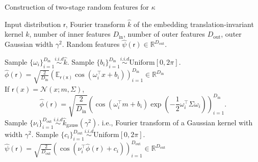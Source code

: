 \documentclass[english]{article}
\theoremstyle{plain}
\theoremstyle{plain}
\begin{document}
\begin{algorithm}[t]
\caption{Construction of two-stage random features for $\kappa$}
\label{algo:random_features_kgg}
\begin{algorithmic}[1]
\REQUIRE Input distribution $\mathsf{r}$, Fourier transform $\hat{k}$ of 
the embedding translation-invariant kernel $k$, number of inner features $D_\mathrm{in}$, number of outer features $D_\mathrm{out}$, outer Gaussian width $\gamma^2$.
\ENSURE Random features $\hat{\psi}(\mathsf{r}) \in \mathbb{R}^{D_\mathrm{out}}$. 

\STATE Sample  $\{ \omega_i \}_{i=1}^{D_\mathrm{in}} \overset{i.i.d}{\sim} \hat{k}$.
\STATE Sample $\{b_i\}_{i=1}^{D_\mathrm{in}} \overset{i.i.d}{\sim} \text{Uniform}[0, 2\pi] $.
\STATE $\hat{\phi}(\mathsf{r}) = \sqrt{\frac{2}{D_\mathrm{in}}} \left( \mathbb{E}_{\mathsf{r(x)}} 
\cos(\omega_{i}^{\top}x+b_{i} ) \right)_{i=1}^{D_\mathrm{in}} \in \mathbb{R}^{D_\mathrm{in}}$ \\
If $\mathsf{r}(x)=\mathcal{N}(x;m, \Sigma )$, 
\small
\begin{equation*}
\hat{\phi}( \mathsf{r}) = \sqrt{\frac{2}{D_\mathrm{in}}} \left( \cos(\omega_{i}^{\top}m +b_{i}) \exp 
\left(-\frac{1}{2}\omega_{i}^{\top}\Sigma \omega_{i} \right) \right)_{i=1}^{D_\mathrm{in}}.
\end{equation*}
%
\STATE Sample $\{ \nu_i \}_{i=1}^{D_\mathrm{out}} \overset{i.i.d}{\sim} \hat{k}_{\text{gauss}}(\gamma^{2})$.  
i.e., Fourier transform of a Gaussian kernel with width $\gamma^2$.
\STATE Sample $\{c_i\}_{i=1}^{D_\mathrm{out}} \overset{i.i.d}{\sim} \text{Uniform}[0, 2\pi] $.
\STATE $\hat{\psi}(\mathsf{r}) = \sqrt{\frac{2}{D_\mathrm{out}}} \left(  
\cos(\nu_{i}^{\top} \hat{\phi}(\mathsf{r}) + c_{i} ) \right)_{i=1}^{D_\mathrm{out}} \in 
\mathbb{R}^{D_\mathrm{out}}$
\end{algorithmic}
\end{algorithm}



\end{document}
